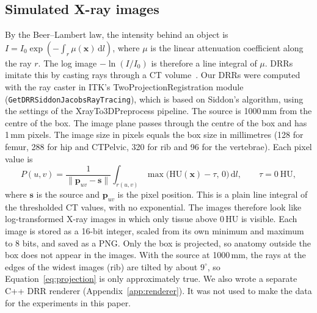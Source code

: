 \documentclass[11pt]{article}
\begin{document}
\begin{table}[t]
\centering
\caption{Datasets, splits and output grids. Counts are samples: one femur side, one vertebra, or one CT for hip, rib and CTPelvic. The voxel size is that of the output grid on which the models are trained and tested.}
\label{tab:data}
\small

\end{table}

\subsection{Simulated X-ray images}\label{sec:drr}
By the Beer--Lambert law, the intensity behind an object is $I=I_0\exp\!\left(-\int_{r}\mu(\mathbf{x})\,\mathrm{d}l\right)$, where $\mu$ is the linear attenuation coefficient along the ray $r$. The log image $-\ln(I/I_0)$ is therefore a line integral of $\mu$. DRRs imitate this by casting rays through a CT volume~\cite{siddon1985}. Our DRRs were computed with the ray caster in ITK's TwoProjectionRegistration module (\texttt{GetDRRSiddonJacobsRayTracing}), which is based on Siddon's algorithm, using the settings of the XrayTo3DPreprocess pipeline. The source is 1000\,mm from the centre of the box. The image plane passes through the centre of the box and has 1\,mm pixels. The image size in pixels equals the box size in millimetres (128 for femur, 288 for hip and CTPelvic, 320 for rib and 96 for the vertebrae). Each pixel value is
\begin{equation}
P(u,v)=\frac{1}{\lVert \mathbf{p}_{uv}-\mathbf{s}\rVert}\int_{r(u,v)}\max\bigl(\mathrm{HU}(\mathbf{x})-\tau,\,0\bigr)\,\mathrm{d}l,\qquad \tau=0\ \mathrm{HU},
\label{eq:drr}
\end{equation}
where $\mathbf{s}$ is the source and $\mathbf{p}_{uv}$ is the pixel position. This is a plain line integral of the thresholded CT values, with no exponential. The images therefore look like log-transformed X-ray images in which only tissue above 0\,HU is visible. Each image is stored as a 16-bit integer, scaled from its own minimum and maximum to 8 bits, and saved as a PNG. Only the box is projected, so anatomy outside the box does not appear in the images. With the source at 1000\,mm, the rays at the edges of the widest images (rib) are tilted by about $9^\circ$, so Equation~\eqref{eq:projection} is only approximately true. We also wrote a separate C++ DRR renderer (Appendix~\ref{app:renderer}). It was not used to make the data for the experiments in this paper.
\end{document}
